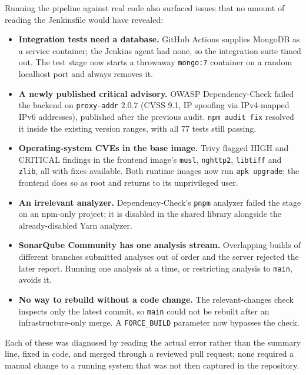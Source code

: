 \documentclass[11pt,a4paper]{article}
\begin{document}
Running the pipeline against real code also surfaced issues that no amount
of reading the Jenkinsfile would have revealed:
\begin{itemize}[nosep]
    \item \textbf{Integration tests need a database.} GitHub Actions supplies
        MongoDB as a service container; the Jenkins agent had none, so the
        integration suite timed out. The test stage now starts a throwaway
        \texttt{mongo:7} container on a random localhost port and always
        removes it.
    \item \textbf{A newly published critical advisory.} OWASP Dependency-Check
        failed the backend on \texttt{proxy-addr} 2.0.7 (CVSS 9.1, IP
        spoofing via IPv4-mapped IPv6 addresses), published after the previous
        audit. \texttt{npm audit fix} resolved it inside the existing version
        ranges, with all 77 tests still passing.
    \item \textbf{Operating-system CVEs in the base image.} Trivy flagged HIGH
        and CRITICAL findings in the frontend image's \texttt{musl},
        \texttt{nghttp2}, \texttt{libtiff} and \texttt{zlib}, all with fixes
        available. Both runtime images now run \texttt{apk upgrade}; the
        frontend does so as root and returns to its unprivileged user.
    \item \textbf{An irrelevant analyzer.} Dependency-Check's \texttt{pnpm}
        analyzer failed the stage on an npm-only project; it is disabled in
        the shared library alongside the already-disabled Yarn analyzer.
    \item \textbf{SonarQube Community has one analysis stream.} Overlapping
        builds of different branches submitted analyses out of order and the
        server rejected the later report. Running one analysis at a time, or
        restricting analysis to \texttt{main}, avoids it.
    \item \textbf{No way to rebuild without a code change.} The relevant-changes
        check inspects only the latest commit, so \texttt{main} could not be
        rebuilt after an infrastructure-only merge. A \texttt{FORCE\_BUILD}
        parameter now bypasses the check.
\end{itemize}
Each of these was diagnosed by reading the actual error rather than the
summary line, fixed in code, and merged through a reviewed pull request; none
required a manual change to a running system that was not then captured in
the repository.
\end{document}
